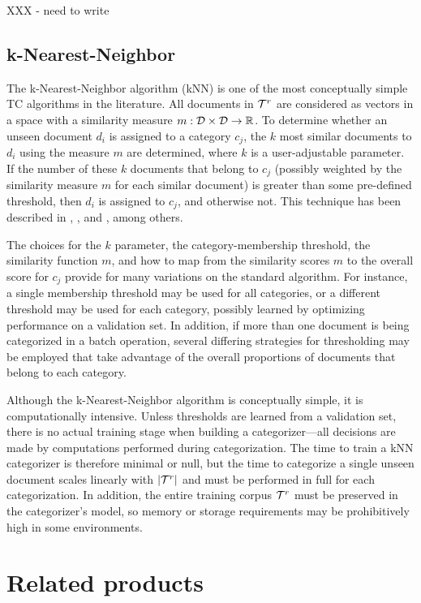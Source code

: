 XXX - need to write

\subsection{k-Nearest-Neighbor}

The k-Nearest-Neighbor algorithm (kNN) is one of the most conceptually
simple TC algorithms in the literature.  All documents in $\mathcal{T}^r$ are
considered as vectors in a space with a similarity measure $m: \mathcal{D}
\times \mathcal{D} \to \mathbb{R}$.  To determine whether an unseen document
$d_i$ is assigned to a category $c_j$, the $k$ most similar documents
to $d_i$ using the measure $m$ are determined, where $k$ is a
user-adjustable parameter.  If the number of these $k$ documents that
belong to $c_j$ (possibly weighted by the similarity measure $m$ for
each similar document) is greater than some pre-defined threshold,
then $d_i$ is assigned to $c_j$, and otherwise not.  This technique
has been described in \cite[p. 28]{sebastiani:02}, \cite{yang:99}, and
\cite{yang:97}, among others.

The choices for the $k$ parameter, the category-membership threshold,
the similarity function $m$, and how to map from the similarity scores
$m$ to the overall score for $c_j$ provide for many variations on the
standard algorithm.  For instance, a single membership threshold may
be used for all categories, or a different threshold may be used for
each category, possibly learned by optimizing performance on a
validation set.  In addition, if more than one document is being
categorized in a batch operation, several differing strategies for
thresholding may be employed that take advantage of the overall
proportions of documents that belong to each category.\cite{yang:01}

Although the k-Nearest-Neighbor algorithm is conceptually simple, it
is computationally intensive.  Unless thresholds are learned from a
validation set, there is no actual training stage when building a
categorizer---all decisions are made by computations performed during
categorization.  The time to train a kNN categorizer is therefore
minimal or null, but the time to categorize a single unseen document
scales linearly with $|\mathcal{T}^r|$ and must be performed in full for each
categorization.  In addition, the entire training corpus $\mathcal{T}^r$ must
be preserved in the categorizer's model, so memory or storage
requirements may be prohibitively high in some environments.


\section{Related products}

